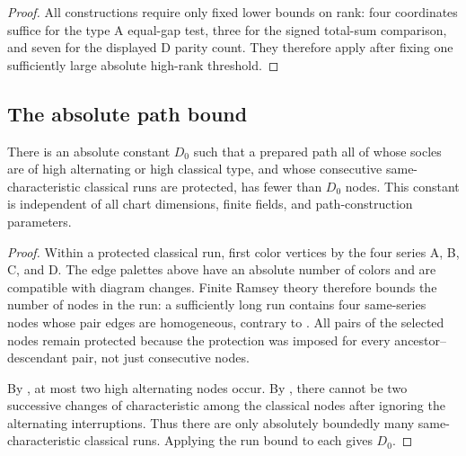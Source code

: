 \begin{proof}
All constructions require only fixed lower bounds on rank: four
coordinates suffice for the type A equal-gap test, three for the signed
total-sum comparison, and seven for the displayed D parity count.
They therefore apply after fixing one sufficiently large absolute
high-rank threshold.
\end{proof}

\subsection{The absolute path bound}

\begin{theorem}\label{w:path-bound}
There is an absolute constant $D_0$ such that a prepared path all of whose socles are of high alternating or high classical type, and whose consecutive same-characteristic classical runs are protected, has fewer than $D_0$ nodes. This constant is independent of all chart dimensions, finite fields, and path-construction parameters.
\end{theorem}
\begin{proof}
Within a protected classical run, first color vertices by the four series A, B, C, and D. The edge palettes above have an absolute number of colors and are compatible with diagram changes. Finite Ramsey theory \citep{Ramsey1930} therefore bounds the number of nodes in the run: a sufficiently long run contains four same-series nodes whose pair edges are homogeneous, contrary to . All pairs of the selected nodes remain protected because the protection was imposed for every ancestor--descendant pair, not just consecutive nodes.

By , at most two high alternating nodes occur. By , there cannot be two successive changes of characteristic among the classical nodes after ignoring the alternating interruptions. Thus there are only absolutely boundedly many same-characteristic classical runs. Applying the run bound to each gives $D_0$.
\end{proof}

